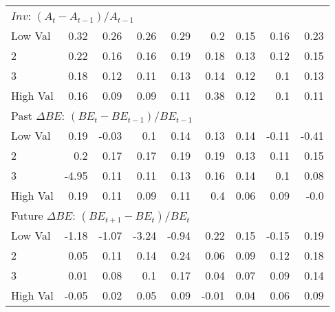 \begin{table}[!ht]
\begin{tabular}{lrrrrrrrr}
    \multicolumn{9}{l}{$Inv$: $(A_t - A_{t-1}) / A_{t-1}$} \\
    Low Val    & 0.32  & 0.26  & 0.26  & 0.29  & 0.2  & 0.15  & 0.16  & 0.23  \\
           2   & 0.22  & 0.16  & 0.16  & 0.19  & 0.18  & 0.13  & 0.12  & 0.15  \\
           3   & 0.18  & 0.12  & 0.11  & 0.13  & 0.14  & 0.12  & 0.1  & 0.13  \\
    High Val   & 0.16  & 0.09  & 0.09  & 0.11  & 0.38  & 0.12  & 0.1  & 0.11  \\
    [1em]
  

    \multicolumn{9}{l}{Past $\Delta BE$: $(BE_t - BE_{t-1}) / BE_{t-1}$} \\
    Low Val    & 0.19  & -0.03  & 0.1  & 0.14  & 0.13  & 0.14  & -0.11  & -0.41  \\
           2   & 0.2  & 0.17  & 0.17  & 0.19  & 0.19  & 0.13  & 0.11  & 0.15  \\
           3   & -4.95  & 0.11  & 0.11  & 0.13  & 0.16  & 0.14  & 0.1  & 0.08  \\
    High Val   & 0.19  & 0.11  & 0.09  & 0.11  & 0.4  & 0.06  & 0.09  & -0.0  \\
    [1em]
  

    \multicolumn{9}{l}{Future $\Delta BE$: $(BE_{t+1} - BE_t) / BE_t$} \\
    Low Val    & -1.18  & -1.07  & -3.24  & -0.94  & 0.22  & 0.15  & -0.15  & 0.19  \\
           2   & 0.05  & 0.11  & 0.14  & 0.24  & 0.06  & 0.09  & 0.12  & 0.18  \\
           3   & 0.01  & 0.08  & 0.1  & 0.17  & 0.04  & 0.07  & 0.09  & 0.14  \\
    High Val   & -0.05  & 0.02  & 0.05  & 0.09  & -0.01  & 0.04  & 0.06  & 0.09  \\
    [1em]
  

  \bottomrule
\end{tabular}
\label{tbl:32_Size_BM_Prior_Sorts}
\end{table}